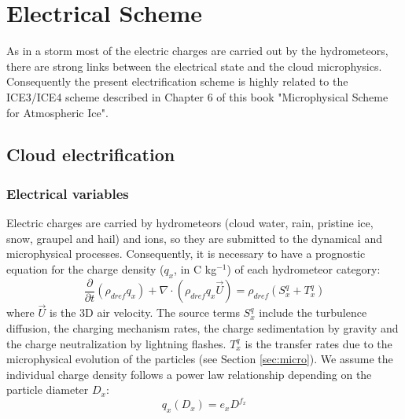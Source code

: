 
\chapter{Electrical Scheme}
\minitoc
As in a storm most of the electric charges are carried out by the hydrometeors, there are strong links between the electrical state and the cloud microphysics.
Consequently the present electrification scheme is highly related to the ICE3/ICE4 scheme described in Chapter 6 of this book "Microphysical Scheme for Atmospheric Ice".

\section{Cloud electrification}

\subsection{Electrical variables}

Electric charges are carried by hydrometeors (cloud water, rain, pristine ice, snow, graupel and hail) and ions, so they are submitted to the dynamical and microphysical processes.
Consequently, it is necessary to have a prognostic equation for the charge density ($q_x$, in C kg$^{-1}$) of each hydrometeor category:
\begin{equation}
  \frac{\partial}{\partial t} (\rho _{dref}q_x) + \nabla \cdot (\rho _{dref} q_x \vec{U}) = \rho _{dref} (S_x ^q + T_x ^q)
\end{equation}
where $\vec{U}$ is the 3D air velocity.
The source terms $S_x ^q$ include the turbulence diffusion, the charging mechanism rates, the charge sedimentation by gravity and the charge neutralization by lightning flashes.
$T_x ^q$ is the transfer rates due to the microphysical evolution of the particles (see Section \ref{sec:micro}).
We assume the individual charge density follows a power law relationship depending on the particle diameter $D_x$:
\begin{equation}
  q_x (D_x) = e_x D^{f_x}
\end{equation}

